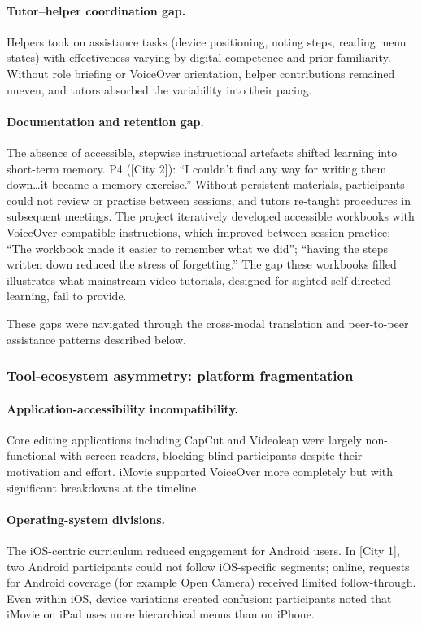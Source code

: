 \paragraph{Tutor--helper coordination gap.}
Helpers took on assistance tasks (device positioning, noting steps, reading menu states) with effectiveness varying by digital competence and prior familiarity. Without role briefing or VoiceOver orientation, helper contributions remained uneven, and tutors absorbed the variability into their pacing.

\paragraph{Documentation and retention gap.}
The absence of accessible, stepwise instructional artefacts shifted learning into short-term memory. P4 ([City 2]): ``I couldn't find any way for writing them down\ldots it became a memory exercise.'' Without persistent materials, participants could not review or practise between sessions, and tutors re-taught procedures in subsequent meetings. The project iteratively developed accessible workbooks with VoiceOver-compatible instructions, which improved between-session practice: ``The workbook made it easier to remember what we did''; ``having the steps written down reduced the stress of forgetting.'' The gap these workbooks filled illustrates what mainstream video tutorials, designed for sighted self-directed learning, fail to provide.

These gaps were navigated through the cross-modal translation and peer-to-peer assistance patterns described below.

\subsubsection{Tool-ecosystem asymmetry: platform fragmentation}

\paragraph{Application-accessibility incompatibility.}
Core editing applications including CapCut and Videoleap were largely non-functional with screen readers, blocking blind participants despite their motivation and effort. iMovie supported VoiceOver more completely but with significant breakdowns at the timeline.

\paragraph{Operating-system divisions.}
The iOS-centric curriculum reduced engagement for Android users. In [City 1], two Android participants could not follow iOS-specific segments; online, requests for Android coverage (for example Open Camera) received limited follow-through. Even within iOS, device variations created confusion: participants noted that iMovie on iPad uses more hierarchical menus than on iPhone.

